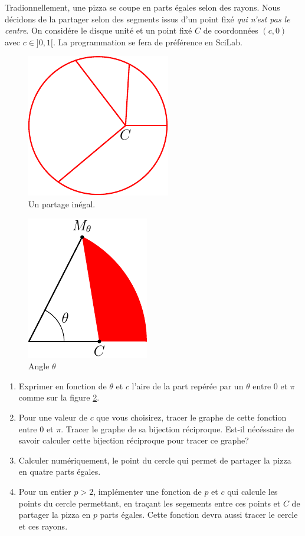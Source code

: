 Tradionnellement, une pizza se coupe en parts égales selon des rayons. Nous décidons de la partager selon des segments issus d'un point fixé \emph{qui n'est pas le centre}.\newline
On considére le disque unité et un point fixé $C$ de coordonnées $(c,0)$ avec $c \in]0,1[$.\newline
La programmation se fera de préférence en SciLab.
\begin{figure}[h]
  \centering
  \includegraphics{./Epizza_1_fig.pdf}
  \caption{Un partage inégal.}
  \label{fig:Epizza_1}
\end{figure}
\begin{figure}[h]
  \centering
  \includegraphics{./Epizza_2_fig.pdf}
  \caption{Angle $\theta$}
  \label{fig:Epizza_2}
\end{figure}
\begin{enumerate}
  \item Exprimer en fonction de $\theta$ et $c$ l'aire de la part repérée par un $\theta$ entre $0$ et $\pi$ comme sur la figure \ref{fig:Epizza_2}.
  \item Pour une valeur de $c$ que vous choisirez, tracer le graphe de cette fonction entre $0$ et $\pi$. Tracer le graphe de sa bijection réciproque. Est-il nécéssaire de savoir calculer cette bijection réciproque pour tracer ce graphe?
  \item Calculer numériquement, le point du cercle qui permet de partager la pizza en quatre parts égales.
  \item Pour un entier $p>2$, implémenter une fonction de $p$ et $c$ qui calcule les points du cercle permettant, en traçant les segements entre ces points et $C$ de partager la pizza en $p$ parts égales. Cette fonction devra aussi tracer le cercle et ces rayons.\newline
\end{enumerate}
